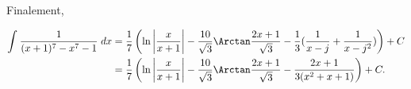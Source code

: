 {{Finalement,

\begin{align*}\ensuremath
\int_{}^{}\frac{1}{(x+1)^7-x^7-1}\;dx&=\frac{1}{7}\left(\ln\left|\frac{x}{x+1}\right|-\frac{10}{\sqrt{3}}
\Arctan\frac{2x+1}{\sqrt{3}}-\frac{1}{3}(\frac{1}{x-j}+\frac{1}{x-j^2})\right)+C\\
 &=\frac{1}{7}\left(\ln\left|\frac{x}{x+1}\right|-\frac{10}{\sqrt{3}}
\Arctan\frac{2x+1}{\sqrt{3}}-\frac{2x+1}{3(x^2+x+1)}\right)+C.
\end{align*}
}
}
